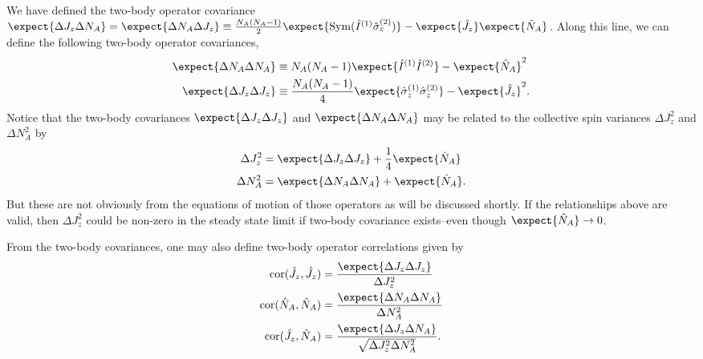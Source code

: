 \documentclass[]{report}
\begin{document}
We have defined the two-body operator covariance $ \expect{\Delta J_z \Delta N_A}=\expect{\Delta N_A\Delta J_z}\equiv  \frac{N_A(N_A-1)}{2}\expect{\mathrm{Sym}(\hat{I}^{(1)}\hat{\sigma}_z^{(2)} ) } - \expect{\hat{J}_z }\expect{\hat{N}_A}$. Along this line, we can define the following two-body operator covariances,
\begin{align}
\expect{\Delta N_A \Delta N_A} &\equiv N_A(N_A-1)\expect{\hat{I}^{(1)}\hat{I}^{(2)} } - \expect{\hat{N}_A}^2\\
\expect{\Delta J_z \Delta J_z} &\equiv \frac{N_A(N_A-1)}{4}\expect{\hat{\sigma}_z^{(1)}\hat{\sigma}_z^{(2)} } - \expect{\hat{J}_z }^2.
\end{align}
Notice that the two-body covariances $ \expect{\Delta J_z \Delta J_z} $ and $ \expect{\Delta N_A \Delta N_A} $ may be related to the collective spin variances $ \Delta J_z^2 $ and $\Delta N_A^2 $ by
\begin{align}
\Delta J_z^2 &= \expect{\Delta J_z \Delta J_z} + \frac{1}{4} \expect{\hat{N}_A}\\
\Delta N_A^2 &= \expect{\Delta N_A \Delta N_A} + \expect{\hat{N}_A}.
\end{align}
But these are not obviously from the equations of motion of those operators as will be discussed shortly.
If the relationships above are valid, then $ \Delta J_z^2 $ could be non-zero in the steady state limit if two-body covariance exists--even though $\expect{\hat{N}_A}\rightarrow 0  $.  

From the two-body covariances, one may also define two-body operator correlations given by
\begin{align}
\mathrm{cor}(\hat{J}_z,\hat{J}_z) &= \frac{\expect{\Delta J_z \Delta J_z}}{\Delta J_z^2}\\
\mathrm{cor}(\hat{N}_A,\hat{N}_A) &= \frac{\expect{\Delta N_A \Delta N_A}}{\Delta N_A^2}\\
\mathrm{cor}(\hat{J}_z,\hat{N}_A) &= \frac{\expect{\Delta J_z \Delta N_A}}{\sqrt{\Delta J_z^2\Delta N_A^2}}.
\end{align}
\end{document}
